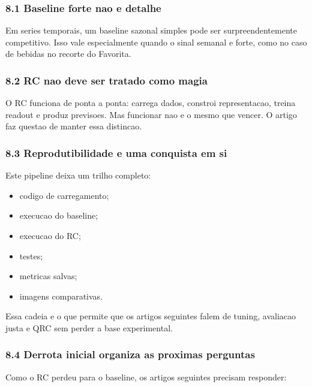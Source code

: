 \documentclass[12pt]{article}
\providecommand{\tightlist}{%
          \setlength{\itemsep}{0pt}\setlength{\parskip}{0pt}}
\begin{document}
\subsubsection{8.1 Baseline forte nao e detalhe}\label{81-baseline-forte-nao-e-detalhe}

Em series temporais, um baseline sazonal simples pode ser surpreendentemente competitivo. Isso vale especialmente quando o sinal semanal e forte, como no caso de bebidas no recorte do Favorita.

\subsubsection{8.2 RC nao deve ser tratado como magia}\label{82-rc-nao-deve-ser-tratado-como-magia}

O RC funciona de ponta a ponta: carrega dados, constroi representacao, treina readout e produz previsoes. Mas funcionar nao e o mesmo que vencer. O artigo faz questao de manter essa distincao.

\subsubsection{8.3 Reprodutibilidade e uma conquista em si}\label{83-reprodutibilidade-e-uma-conquista-em-si}

Este pipeline deixa um trilho completo:

\begin{itemize}
\tightlist
\item
  codigo de carregamento;
\item
  execucao do baseline;
\item
  execucao do RC;
\item
  testes;
\item
  metricas salvas;
\item
  imagens comparativas.
\end{itemize}

Essa cadeia e o que permite que os artigos seguintes falem de tuning, avaliacao justa e QRC sem perder a base experimental.

\subsubsection{8.4 Derrota inicial organiza as proximas perguntas}\label{84-derrota-inicial-organiza-as-proximas-perguntas}

Como o RC perdeu para o baseline, os artigos seguintes precisam responder:
\end{document}
